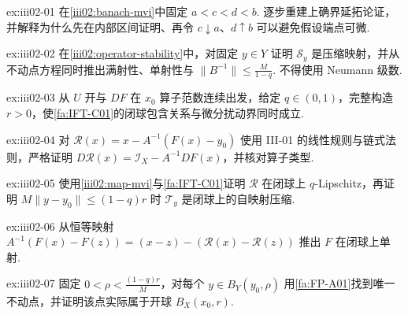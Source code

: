 \begin{FAExercise}{ex:iii02-01}
在\autoref{iii02:banach-mvi}中固定 \(\displaystyle a<c<d<b\). 逐步重建上确界延拓论证，并解释为什么先在内部区间证明、再令 \(\displaystyle c\downarrow a\)、\(\displaystyle d\uparrow b\) 可以避免假设端点可微.
\end{FAExercise}

\begin{FAExercise}[算子扰动的不动点求逆]{ex:iii02-02}
在\autoref{iii02:operator-stability}中，对固定 \(\displaystyle y\in Y\) 证明 \(\displaystyle\mathcal S_y\) 是压缩映射，并从不动点方程同时推出满射性、单射性与 \(\displaystyle\|B^{-1}\|\leqslant \frac{M}{1-q}\). 不得使用 Neumann 级数.
\end{FAExercise}

\begin{FAExercise}[局部可逆性半径的选择]{ex:iii02-03}
从 \(\displaystyle U\) 开与 \(\displaystyle DF\) 在 \(\displaystyle x_0\) 算子范数连续出发，给定 \(\displaystyle q\in(0,1)\)，完整构造 \(\displaystyle r>0\)，使\autoref{fa:IFT-C01}的闭球包含关系与微分扰动界同时成立.
\end{FAExercise}

\begin{FAExercise}{ex:iii02-04}
对 \(\displaystyle\mathcal R(x)=x-A^{-1}(F(x)-y_0)\) 使用 III-01 的线性规则与链式法则，严格证明 \(\displaystyle D\mathcal R(x)=\mathcal I_X-A^{-1}DF(x)\)，并核对算子类型.
\end{FAExercise}

\begin{FAExercise}[Newton 压缩]{ex:iii02-05}
使用\autoref{iii02:map-mvi}与\autoref{fa:IFT-C01}证明 \(\displaystyle\mathcal R\) 在闭球上 \(\displaystyle q\)-Lipschitz，再证明 \(\displaystyle M\|y-y_0\|\leqslant(1-q)r\) 时 \(\displaystyle\mathcal T_y\) 是闭球上的自映射压缩.
\end{FAExercise}

\begin{FAExercise}[局部单射性]{ex:iii02-06}
从恒等映射 \(\displaystyle A^{-1}(F(x)-F(z))=(x-z)-(\mathcal R(x)-\mathcal R(z))\) 推出 \(\displaystyle F\) 在闭球上单射.
\end{FAExercise}

\begin{FAExercise}[局部满射半径]{ex:iii02-07}
固定 \(\displaystyle0<\rho<\frac{(1-q)r}{M}\)，对每个 \(\displaystyle y\in B_Y(y_0,\rho)\) 用\autoref{fa:FP-A01}找到唯一不动点，并证明该点实际属于开球 \(\displaystyle B_X(x_0,r)\).
\end{FAExercise}


